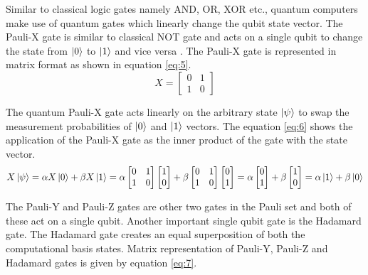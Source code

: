 \documentclass[english,a4paper,11pt,oneside,onecolumn]{book}
\begin{document}
Similar to classical logic gates namely AND, OR, XOR etc., quantum computers make use of quantum gates which linearly change the qubit state vector. The Pauli-X gate is similar to classical NOT gate and acts on a single qubit to change the state from \(\ket{0}\) to \(\ket{1}\) and vice versa \cite{matuschak_2019_quantum}. The Pauli-X gate is represented in matrix format as shown in equation \ref{eq:5}.
\begin{equation}\label{eq:5}
X = 
\begin{bmatrix}
0 & 1\\
1 & 0
\end{bmatrix}
\end{equation}

The quantum Pauli-X gate acts linearly on the arbitrary state $\ket{\psi}$ to swap the measurement probabilities of \(\ket{0}\) and \(\ket{1}\) vectors. The equation \ref{eq:6} shows the application of the Pauli-X gate as the inner product of the gate with the state vector.
\begin{equation}\label{eq:6}
X\ket{\psi} = \alpha X \ket{0} + \beta X \ket{1} = 
\alpha
\begin{bmatrix}
0 & 1\\
1 & 0
\end{bmatrix}
\begin{bmatrix}
1\\
0
\end{bmatrix} + 
\beta
\begin{bmatrix}
0 & 1\\
1 & 0
\end{bmatrix}
\begin{bmatrix}
0\\
1
\end{bmatrix} = 
\alpha
\begin{bmatrix}
0\\
1
\end{bmatrix} + 
\beta
\begin{bmatrix}
1\\
0
\end{bmatrix} =
\alpha\ket{1} + \beta\ket{0}
\end{equation}

The Pauli-Y and Pauli-Z gates are other two gates in the Pauli set and both of these act on a single qubit. Another important single qubit gate is the Hadamard gate. The Hadamard gate creates an equal superposition of both the computational basis states. Matrix representation of Pauli-Y, Pauli-Z and Hadamard gates is given by equation \ref{eq:7}. 
\end{document}
